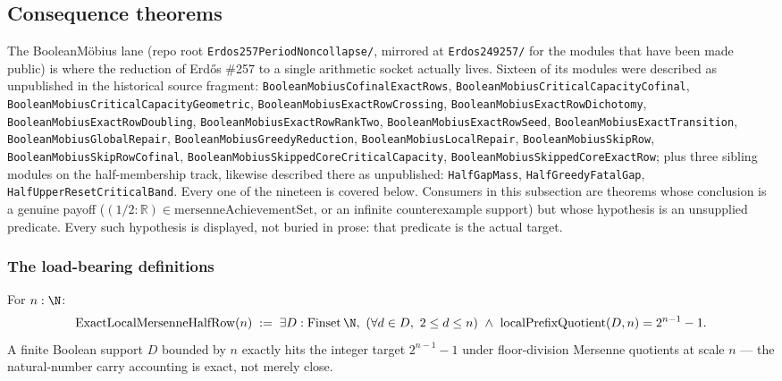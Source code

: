 \subsection{Consequence theorems}

The BooleanM\"obius lane (repo root \texttt{Erdos257PeriodNoncollapse/}, mirrored at
\texttt{Erdos249257/} for the modules that have been made public) is where the reduction
of Erd\H{o}s \#257 to a single arithmetic socket actually lives. Sixteen of its modules
were described as unpublished in the historical source fragment: \texttt{BooleanMobiusCofinalExactRows},
\texttt{BooleanMobiusCriticalCapacityCofinal}, \texttt{BooleanMobiusCriticalCapacityGeometric},
\texttt{BooleanMobiusExactRowCrossing}, \texttt{BooleanMobiusExactRowDichotomy},
\texttt{BooleanMobiusExactRowDoubling}, \texttt{BooleanMobiusExactRowRankTwo},
\texttt{BooleanMobiusExactRowSeed}, \texttt{BooleanMobiusExactTransition},
\texttt{BooleanMobiusGlobalRepair}, \texttt{BooleanMobiusGreedyReduction},
\texttt{BooleanMobiusLocalRepair}, \texttt{BooleanMobiusSkipRow},
\texttt{BooleanMobiusSkipRowCofinal}, \texttt{BooleanMobiusSkippedCoreCriticalCapacity},
\texttt{BooleanMobiusSkippedCoreExactRow}; plus three sibling modules on the half-membership
track, likewise described there as unpublished: \texttt{HalfGapMass}, \texttt{HalfGreedyFatalGap},
\texttt{HalfUpperResetCriticalBand}. Every one of the nineteen is covered below. Consumers
in this subsection are theorems whose conclusion is a genuine payoff
($(1/2:\mathbb{R})\in\mathrm{mersenneAchievementSet}$, or an infinite counterexample support)
but whose hypothesis is an unsupplied predicate. Every such hypothesis is displayed, not
buried in prose: that predicate is the actual target.

\subsubsection*{The load-bearing definitions}

\begin{defn}
For $n:\N$:
\[
\mathrm{ExactLocalMersenneHalfRow}(n) \;:=\; \exists D:\mathrm{Finset}\,\N,\ (\forall d\in D,\ 2\le d\le n) \ \wedge\ \mathrm{localPrefixQuotient}(D,n) = 2^{n-1}-1 .
\]
A finite Boolean support $D$ bounded by $n$ exactly hits the integer target $2^{n-1}-1$ under
floor-division Mersenne quotients at scale $n$ — the natural-number carry accounting is
exact, not merely close.
\par\noindent{}   
\end{defn}

